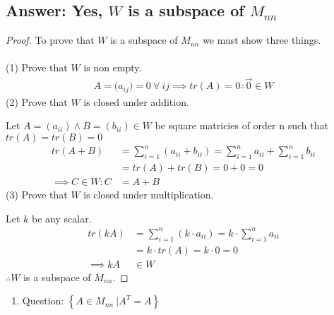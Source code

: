 \documentclass[11pt]{article}
\newcommand{\DS} [1] {${\displaystyle #1}$}
\begin{document}
\subsection{Answer: Yes, $W$ is a subspace of $M_{nn}$}
\begin{proof}
        To prove that $W$ is a subspace of $M_{nn}$ we must show three things.\\\\
        (1) Prove that $W$ is non empty.
        \begin{align*}
                A=({a_{ij})=0}\ \forall\ ij \implies tr(A)=0 \therefore \vec{0} \in W
        \end{align*}
        (2) Prove that $W$ is closed under addition.

        Let $A = ({a_{ii}})\land B = ({b_{ii}})\in W$ be square matricies of order n such that $tr(A) = tr(B) = 0$
        \begin{align*}
                tr(A+B)             & = \sum_{i = 1}^{n}(a_{ii}+b_{ii}) = \sum_{i = 1}^{n}a_{ii} + \sum_{i = 1}^{n}b_{ii} \\
                                    & = tr(A) + tr(B) = 0 + 0 = 0                                                         \\
                \implies C\in W : C & = A+B
        \end{align*}
        (3) Prove that $W$ is closed under multiplication.

        Let ${k}$ be any scalar.
        \begin{align*}
                tr(kA)      & = \sum_{i = 1}^{n}(k\cdot a_{ii}) = k\cdot \sum_{i = 1}^{n}a_{ii} \\
                            & = k\cdot tr(A) = k\cdot 0 = 0                                     \\
                \implies kA & \in W
        \end{align*}
        $\therefore W$ is a subspace of $M_{nn}$.
\end{proof}
\pagebreak
\begin{enumerate}
        \item [3.c]Question: \DS{ \left\{A \in{M_{nn}} \ | A^T = A \right\}}
\end{enumerate}
\end{document}
